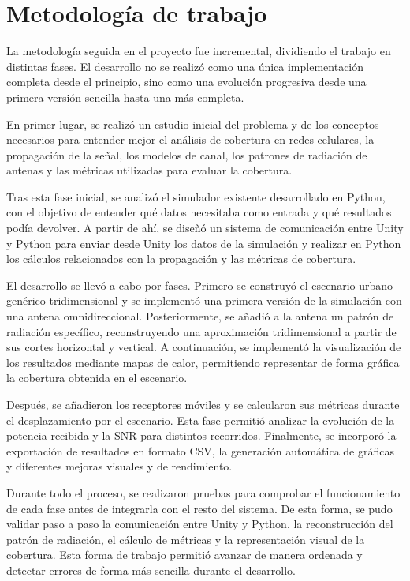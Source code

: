 \section{Metodología de trabajo}

La metodología seguida en el proyecto fue incremental, dividiendo el trabajo en distintas fases. El desarrollo no se realizó como una única implementación completa desde el principio, sino como una evolución progresiva desde una primera versión sencilla hasta una más completa.

En primer lugar, se realizó un estudio inicial del problema y de los conceptos necesarios para entender mejor el análisis de cobertura en redes celulares, la propagación de la señal, los modelos de canal, los patrones de radiación de antenas y las métricas utilizadas para evaluar la cobertura.

Tras esta fase inicial, se analizó el simulador existente desarrollado en Python, con el objetivo de entender qué datos necesitaba como entrada y qué resultados podía devolver. A partir de ahí, se diseñó un sistema de comunicación entre Unity y Python para enviar desde Unity los datos de la simulación y realizar en Python los cálculos relacionados con la propagación y las métricas de cobertura.

El desarrollo se llevó a cabo por fases. Primero se construyó el escenario urbano genérico tridimensional y se implementó una primera versión de la simulación con una antena omnidireccional. Posteriormente, se añadió a la antena un patrón de radiación específico, reconstruyendo una aproximación tridimensional a partir de sus cortes horizontal y vertical. A continuación, se implementó la visualización de los resultados mediante mapas de calor, permitiendo representar de forma gráfica la cobertura obtenida en el escenario.

Después, se añadieron los receptores móviles y se calcularon sus métricas durante el desplazamiento por el escenario. Esta fase permitió analizar la evolución de la potencia recibida y la SNR para distintos recorridos. Finalmente, se incorporó la exportación de resultados en formato CSV, la generación automática de gráficas y diferentes mejoras visuales y de rendimiento.

Durante todo el proceso, se realizaron pruebas para comprobar el funcionamiento de cada fase antes de integrarla con el resto del sistema. De esta forma, se pudo validar paso a paso la comunicación entre Unity y Python, la reconstrucción del patrón de radiación, el cálculo de métricas y la representación visual de la cobertura. Esta forma de trabajo permitió avanzar de manera ordenada y detectar errores de forma más sencilla durante el desarrollo.

